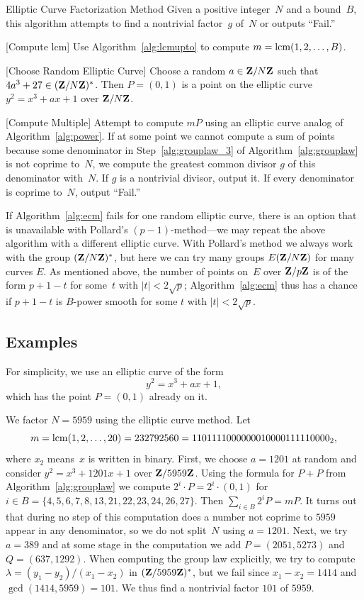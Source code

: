 \begin{algorithm}{Elliptic Curve Factorization Method}\label{alg:ecm}
Given a positive integer~$N$ and a bound~$B$, this algorithm
attempts to find a nontrivial factor~$g$ of~$N$ or outputs
``Fail.''
\begin{steps}
\item{}[Compute lcm]
Use Algorithm~\ref{alg:lcmupto} to compute $m=\operatorname{lcm}(1,2,\ldots, B)$.
\item{}[Choose Random Elliptic Curve]
Choose a random $a\in \mathbf{Z}/N\mathbf{Z}{}$ such that $4a^3+27\in(\mathbf{Z}/N\mathbf{Z}{})^*$.
Then $P=(0,1)$ is a point on the elliptic curve $y^2=x^3+ax+1$
over $\mathbf{Z}/N\mathbf{Z}{}$.
\item{}[Compute Multiple] Attempt to compute $m P$ using an
elliptic curve analog of Algorithm~\ref{alg:power}.
If at some point we cannot compute a sum of points
because some denominator in Step~\ref{alg:grouplaw_3} of
Algorithm~\ref{alg:grouplaw} is not coprime to~$N$, we
compute the greatest common divisor $g$ of this denominator with~$N$.  If $g$
is a nontrivial divisor, output it.  If every
denominator is coprime to~$N$, output ``Fail.''
\end{steps}
\end{algorithm}

If Algorithm~\ref{alg:ecm} fails for one random elliptic curve, there
is an option that is unavailable with Pollard's $(p-1)$-method---we
may repeat the above algorithm with a different elliptic curve.  With
Pollard's method we always work with the group $(\mathbf{Z}/N\mathbf{Z}{})^*$, but
here we can try many groups $E(\mathbf{Z}/N\mathbf{Z}{})$ for many curves $E$.  As
mentioned above, the number of points on~$E$ over $\mathbf{Z}/p\mathbf{Z}{}$ is of the
form $p+1-t$ for some~$t$ with $|t|<2\sqrt{p}$;
Algorithm~\ref{alg:ecm} thus has a chance if $p+1-t$ is
$B$-power smooth for some $t$ with $|t|<2\sqrt{p}$.

\subsection{Examples}\label{sec:ecm_examples}
For simplicity, we use an elliptic curve of the form
$$y^2 = x^3 + ax + 1,$$
which has the point $P=(0,1)$ already on it.

We factor $N=5959$ using the elliptic curve method.
Let
$$
  m=\operatorname{lcm}(1,2,\ldots,20) = 232792560 = 1101111000000010000111110000_2,
$$
where $x_2$ means~$x$ is written in binary.
First, we choose $a=1201$ at random and consider
$y^2 = x^3 + 1201x + 1$ over $\mathbf{Z}/5959\mathbf{Z}{}$.
Using the formula for $P+P$ from
Algorithm~\ref{alg:grouplaw}
we compute
$2^i\cdot P = 2^i\cdot (0,1)$
for $i\in B=\{4, 5, 6, 7, 8, 13, 21, 22, 23, 24, 26, 27 \}$.
Then $\sum_{i\in B} 2^i P = m P$.  It turns out that during no
step of this computation does a number not coprime to
$5959$ appear in any denominator, so we do not split~$N$
using $a=1201$.  Next, we try $a=389$ and at some stage
in the computation we add
$P=(2051,5273)$ and $Q=(637,1292)$.
When computing the group law explicitly, we try
to compute $\lambda = (y_1-y_2)/(x_1-x_2)$ in $(\mathbf{Z}/5959\mathbf{Z})^*$,
but we fail since $x_1-x_2 = 1414$ and $\gcd(1414,5959)=101$.
We thus find a nontrivial factor $101$ of $5959$.

